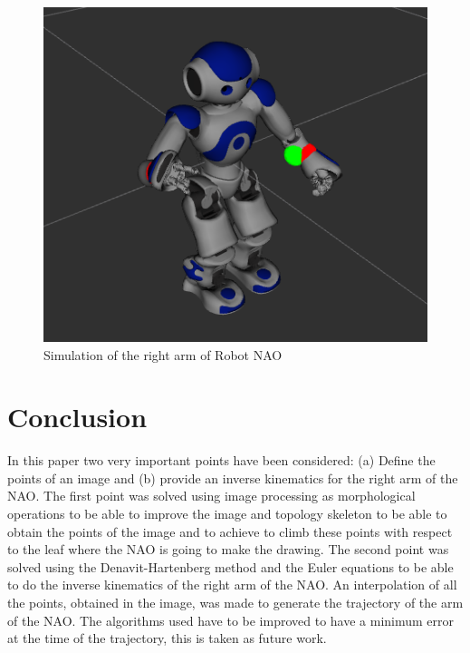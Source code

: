 \documentclass[conference]{IEEEtran}
\begin{document}
\begin{figure}
\centering
\includegraphics[scale=0.3]{nao1.png}
\caption{Simulation of the right arm of Robot NAO}
\label{f:nao}
\end{figure}
\section{Conclusion}
\label{sec:conclusion}
In this paper two very important points have been considered: (a) Define the points of an image and (b) provide an inverse kinematics for the right arm of the NAO. The first point was solved using image processing as morphological operations to be able to improve the image and topology skeleton to be able to obtain the points of the image and to achieve to climb these points with respect to the leaf where the NAO is going to make the drawing. The second point was solved using the Denavit-Hartenberg method and the Euler equations to be able to do the inverse kinematics of the right arm of the NAO.
An interpolation of all the points, obtained in the image, was made to generate the trajectory of the arm of the NAO. The algorithms used have to be improved to have a minimum error at the time of the trajectory, this is taken as future work.


\end{document}
